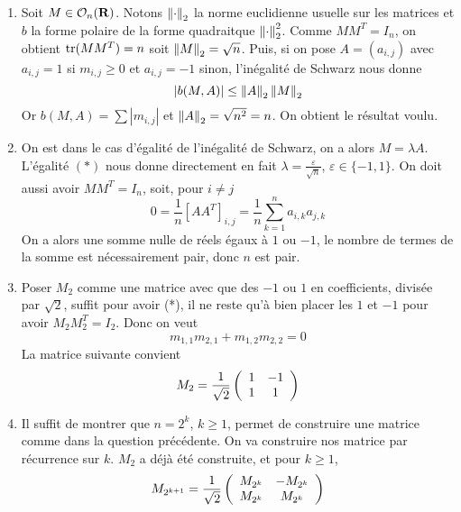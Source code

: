 \begin{correction}
	\begin{enumerate}
		\item Soit $M\in\mathcal O_n(\operatorname{\mathbf{R}})$. 
		Notons $\left\lVert \cdot\right\rVert_2$ la norme euclidienne usuelle sur les matrices et $b$ la forme polaire de la forme quadraitque $\left\lVert \cdot\right\rVert_2^2$. 
		Comme $MM^T=I_n$, on obtient $\operatorname{tr}(MM^T)=n$ soit $\left\lVert M\right\rVert_2=\sqrt n$. 
		Puis, si on pose $A=(a_{i,j})$ avec $a_{i,j}=1$ si $m_{i,j}\geq 0$ et $a_{i,j}=-1$ sinon, l'inégalité de Schwarz nous donne
		\[
			|b(M,A)|\leq\left\lVert A\right\rVert_2\left\lVert M\right\rVert_2
		\]
		Or $b(M,A)=\sum|m_{i,j}|$ et $\left\lVert A\right\rVert_2=\sqrt{n^2}=n$. 
		On obtient le résultat voulu.

		\item On est dans le cas d'égalité de l'inégalité de Schwarz, on a alors $M=\lambda A$.
		L'égalité $(*)$ nous donne directement en fait $\lambda=\frac\varepsilon{\sqrt n}$, $\varepsilon\in\lbrace -1,1\rbrace$. 
		On doit aussi avoir $MM^T=I_n$, soit, pour $i\neq j$
		\[
			0=\frac1n[AA^T]_{i,j}=\frac1n\sum_{k=1}^na_{i,k}a_{j,k}
		\]
		On a alors une somme nulle de réels égaux à $1$ ou $-1$, le nombre de termes de la somme est nécessairement pair, donc $n$ est pair.

		\item Poser $M_2$ comme une matrice avec que des $-1$ ou $1$ en coefficients, divisée par $\sqrt2$, suffit pour avoir (*),
		il ne reste qu'à bien placer les $1$ et $-1$ pour avoir $M_2M_2^T=I_2$. 
		Donc on veut
		\[
			m_{1,1}m_{2,1}+m_{1,2}m_{2,2}=0
		\]
		La matrice suivante convient 
		\[
			M_2=\frac1{\sqrt2}\left(\begin{array}{c c} 1 & -1\\ 1 & 1\end{array}\right)
		\]
		
		\item Il suffit de montrer que $n=2^k$, $k\geq 1$, permet de construire une matrice comme dans la question précédente.
		On va construire nos matrice par récurrence sur $k$. 
		$M_2$ a déjà été construite, et pour $k\geq 1$, 
		\[
			M_{2^{k+1}}=\frac1{\sqrt2}\left(\begin{array}{c c} M_{2^k} & -M_{2^k}\\ M_{2^k} & M_{2^k}\end{array}\right)
		\]
		

\end{enumerate}
\end{correction}
